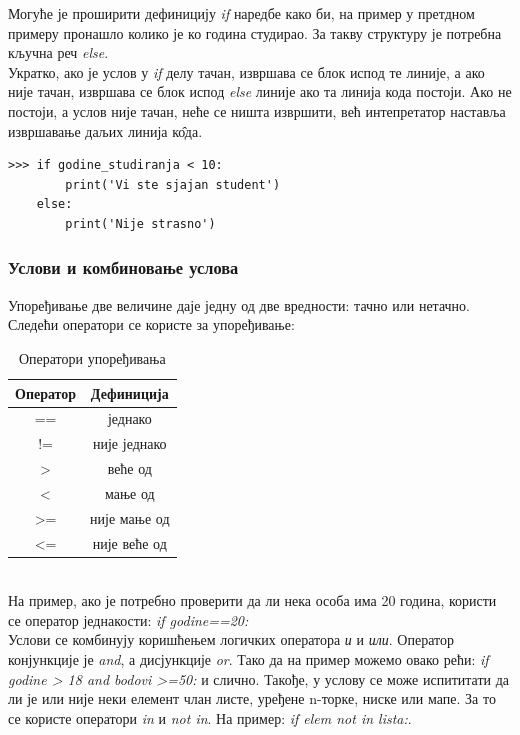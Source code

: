 \documentclass[11pt, serbianc, english, titlepage]{article}
\begin{document}
		Могуће је проширити дефиницију \emph{if} наредбе како би, на пример у претдном примеру пронашло колико је ко година студирао. За такву структуру је потребна кључна реч \emph{else}. \\
		Укратко, ако је услов у \emph{if} делу тачан, извршава се блок испод те линије, а ако није тачан, извршава се блок испод \emph{else} линије ако та линија кода постоји. Ако не постоји, а услов није тачан, неће се ништа извршити, већ интепретатор наставља извршавање даљих линија к\^{о}да. 
		\begin{lstlisting}[caption = Пример за наредбе IF - ELSE, label = ifelse]
>>> if godine_studiranja < 10:
        print('Vi ste sjajan student')
    else:
        print('Nije strasno')
        \end{lstlisting}
        \subsubsection{Услови и комбиновање услова}
        Упоређивање две величине даје једну од две вредности: тачно или нетачно. Следећи оператори се користе за упоређивање:
        \begin{table}[here]
        \centering    
        \begin{tabular}{|c|c|} \hline
        \textbf{Оператор} & \textbf{Дефиниција} \\ \hline \hline
        == & једнако \\ \hline
        != & није једнако \\ \hline
        > & веће од  \\ \hline
        < & мање од \\ \hline
        >= & није мање од \\ \hline
        <= & није веће од \\ \hline
        \end{tabular}\medskip
        \caption{Оператори упоређивања}
        \label{tabele:opporedjenja}
        \end{table}\\
        
        На пример, ако је потребно проверити да ли нека особа има 20 година, користи се оператор једнакости: \emph{if godine==20:}\\
        
        Услови се комбинују коришћењем логичких оператора \emph{и} и \emph{или}. Оператор конјункције је \emph{and}, а дисјункције \emph{or}. Тако да на пример можемо овако рећи: \emph{if godine > 18 and bodovi >=50:} и слично.
        \pagebreak
        Такође, у услову се може испититати да ли је или није неки елемент члан листе, уређене n-торке, ниске или мапе.  За то се користе оператори \emph{in} и \emph{not in}. На пример: \emph{if elem not in lista:}. 
\end{document}
